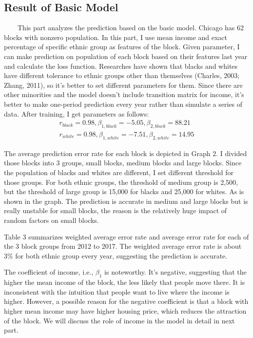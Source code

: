 \documentclass{article}
\begin{document}
\subsection{Result of Basic Model}
\ \ \ \ This part analyzes the prediction based on the basic model. Chicago has 62 blocks with nonzero population. In this part, I use mean income and exact percentage of specific ethnic group as features of the block. Given parameter, I can make prediction on population of each block based on their features last year and calculate the loss function. Researches have shown that blacks and whites have different tolerance to ethnic groups other than themselves (Charles, 2003\cite{Charles}; Zhang, 2011\cite{Zhang2011}), so it's better to set different parameters for them. Since there are other minorities and the model doesn't include transition matrix for income, it's better to make one-period prediction every year rather than simulate a series of data. After training, I get parameters as follows:
\begin{eqnarray}
r_{black} = 0.98, \beta_{1,black} = -5.05, \beta_{2,black} = 88.21 \nonumber \\
r_{white} = 0.98, \beta_{1,white} = -7.51, \beta_{2,white} = 14.95 \nonumber
\end{eqnarray}
\par The average prediction error rate for each block is depicted in Graph 2. I divided those blocks into 3 groups, small blocks, medium blocks and large blocks. Since the population of blacks and whites are different, I set different threshold for those groups. For both ethnic groups, the threshold of medium group is 2,500, but the threshold of large group is 15,000 for blacks and 25,000 for whites. As is shown in the graph. The prediction is accurate in medium and large blocks but is really unstable for small blocks, the reason is the relatively huge impact of random factors on small blocks. 
\par Table 3 summarizes weighted average error rate and average error rate for each of the 3 block groups from 2012 to 2017. The weighted average error rate is about 3\% for both ethnic group every year, suggesting the prediction is accurate.
\par The coefficient of income, i.e., $\beta_1$ is noteworthy. It's negative, suggesting that the higher the mean income of the block, the less likely that people move there. It is inconsistent with the intuition that people want to live where the income is higher. However, a possible reason for the negative coefficient is that a block with higher mean income may have higher housing price, which reduces the attraction of the block. We will discuss the role of income in the model in detail in next part.
\end{document}

